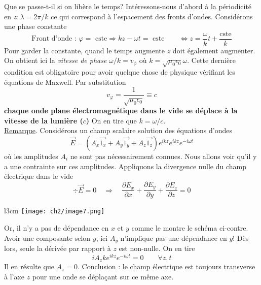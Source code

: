 Que se passe-t-il si on libère le temps? Intéressons-nous d'abord à la périodicité en 
$z : \lambda = 2\pi/k$ ce qui correspond à l'espacement des fronts d'ondes. Considérons 
une phase constante
\begin{equation}
\text{Front d'onde : } \varphi = \text{ cste} \Rightarrow  kz-\omega t = \text{ cste} \qquad 
\Longleftrightarrow z = \dfrac{\omega}{k}t+\dfrac{\text{cste}}{k}
\end{equation}
Pour garder la constante, quand le temps augmente $z$ doit également augmenter. On obtient 
ici la \textit{vitesse de phase} $\omega/k = v_\phi$ où $k = \sqrt{\mu_0\epsilon_0}\omega$. 
Cette dernière condition est obligatoire pour avoir quelque chose de physique vérifiant 
les équations de Maxwell. Par substitution
\begin{equation}
v_\varphi = \dfrac{1}{\sqrt{\mu_0\epsilon_0}} \equiv c
\end{equation}
\textbf{chaque onde plane électromagnétique dans le vide se déplace à la vitesse de la lumière ($c$)}
On en tire que $k=\omega/c$.\\

\underline{Remarque}. Considérons un champ scalaire solution des équations d'ondes 
\begin{equation}
\vec{E} = (A_x\vec{1_x}+A_y\vec{1_y}+A_z\vec{1_z})e^{ikz}e^{ikz}e^{-i\omega t}
\end{equation}
où les amplitudes $A_i$ ne sont pas nécessairement connues. Nous allons voir qu'il y a 
une contrainte sur ces amplitudes. Appliquons la divergence nulle du champ électrique 
dans le vide
\begin{equation}
\div \vec{E} = 0 \quad \Longrightarrow\quad \dfrac{\partial E_x}{\partial x}+
\dfrac{\partial E_y}{\partial y} + \dfrac{\partial E_z}{\partial z} = 0
\end{equation}

\begin{wrapfigure}[6]{l}{3cm}
\vspace{-16mm}
\texttt{[image: ch2/image7.png]}
\end{wrapfigure}
Or, il n'y a pas de dépendance en $x$ et $y$ comme le montre le schéma ci-contre. Avoir 
une composante selon $y$, ici $A_y$ n'implique pas une dépendance en $y$! Dès lors, 
seule la dérivée par rapport à $z$ est non-nulle. On en tire
\begin{equation}
iA_zke^{ikz}e^{-i\omega t} = 0\qquad \forall z,t
\end{equation}
Il en résulte que $A_z = 0$. Conclusion : le champ électrique est toujours transverse à 
l'axe $z$ pour une onde se déplaçant sur ce même axe.\\

